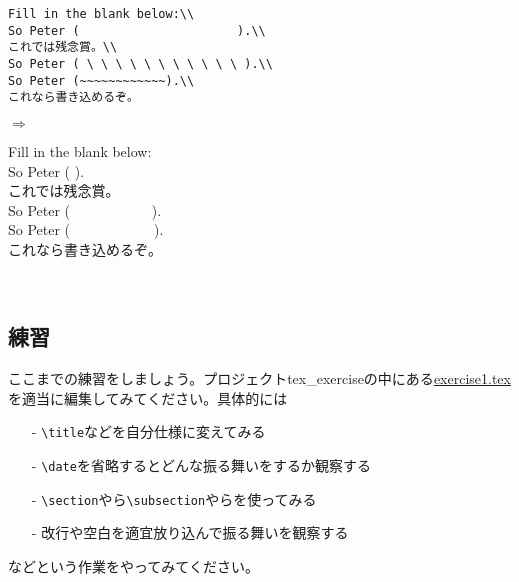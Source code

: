 \begin{minipage}[c]{.50\textwidth}
\begin{screen}
\small
\begin{verbatim}
Fill in the blank below:\\
So Peter (                      ).\\
これでは残念賞。\\
So Peter ( \ \ \ \ \ \ \ \ \ \ \ ).\\
So Peter (~~~~~~~~~~~~).\\
これなら書き込めるぞ。
\end{verbatim}
\end{screen}
\end{minipage}%
$\Rightarrow$
\begin{minipage}{.45\textwidth}
\begin{shadebox}
Fill in the blank below:\\
So Peter (                      ).\\
これでは残念賞。\\
So Peter ( \ \ \ \ \ \ \ \ \ \ \ ).\\
So Peter (~~~~~~~~~~~~).\\
これなら書き込めるぞ。
\end{shadebox}
\end{minipage}
\vspace*{1mm}\\

\subsection{練習}
ここまでの練習をしましょう。プロジェクトtex\_exerciseの中にある\underline{exercise1.tex}を適当に編集してみてください。具体的には
\begin{itemize}
 \item[-] \verb+\title+などを自分仕様に変えてみる
 \item[-] \verb+\date+を省略するとどんな振る舞いをするか観察する
 \item[-] \verb+\section+やら\verb+\subsection+やらを使ってみる
 \item[-] 改行や空白を適宜放り込んで振る舞いを観察する
\end{itemize}
などという作業をやってみてください。

\pagebreak
